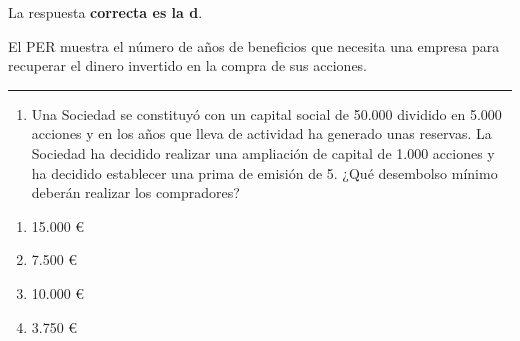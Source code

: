 \documentclass[
  letterpaper,
  DIV=11,
  numbers=noendperiod]{scrreprt}
\providecommand{\tightlist}{%
  \setlength{\itemsep}{0pt}\setlength{\parskip}{0pt}}\usepackage{longtable,booktabs,array}
\begin{document}
\begin{tcolorbox}[enhanced jigsaw, left=2mm, opacityback=0, colback=white, breakable, arc=.35mm, bottomrule=.15mm, rightrule=.15mm, toprule=.15mm, leftrule=.75mm, colframe=quarto-callout-tip-color-frame]
\begin{minipage}[t]{5.5mm}
\textcolor{quarto-callout-tip-color}{\faLightbulb}
\end{minipage}%
\begin{minipage}[t]{\textwidth - 5.5mm}

La respuesta \textbf{correcta es la d}.

El PER muestra el número de años de beneficios que necesita una empresa
para recuperar el dinero invertido en la compra de sus acciones.

\end{minipage}%
\end{tcolorbox}

\begin{center}\rule{0.5\linewidth}{0.5pt}\end{center}

\begin{enumerate}
\def\labelenumi{\arabic{enumi}.}
\setcounter{enumi}{57}
\tightlist
\item
  Una Sociedad se constituyó con un capital social de 50.000 dividido en
  5.000 acciones y en los años que lleva de actividad ha generado unas
  reservas. La Sociedad ha decidido realizar una ampliación de capital
  de 1.000 acciones y ha decidido establecer una prima de emisión de 5.
  ¿Qué desembolso mínimo deberán realizar los compradores?
\end{enumerate}

\begin{enumerate}
\def\labelenumi{\alph{enumi}.}
\item
  15.000 €
\item
  7.500 €
\item
  10.000 €
\item
  3.750 €
\end{enumerate}
\end{document}

